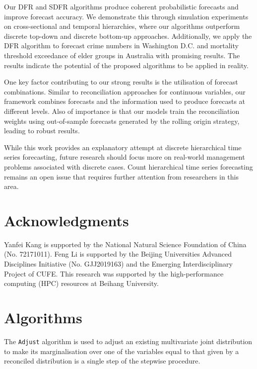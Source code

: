\documentclass[a4paper,review,12pt,authoryear]{elsarticle}
\let\code=\texttt
\theoremstyle{definition}
\begin{document}
     Our DFR and SDFR algorithms produce coherent probabilistic forecasts and improve forecast accuracy.
     We demonstrate this through simulation experiments on cross-sectional and temporal hierarchies, where our algorithms outperform discrete top-down and discrete bottom-up approaches. Additionally, we apply the DFR algorithm to forecast crime numbers in Washington D.C. and mortality threshold exceedance of elder groups in Australia with promising results.
     The results indicate the potential of the proposed algorithms to be applied in reality.

     One key factor contributing to our strong results is the utilisation of forecast combinations.
     Similar to reconciliation approaches for continuous variables, our framework combines forecasts and the information used to produce forecasts at different levels.
     Also of importance is that our models train the reconciliation weights using out-of-sample forecasts generated by the rolling origin strategy, leading to robust results.


     While this work provides an explanatory attempt at discrete hierarchical time series forecasting, future research should focus more on real-world management problems associated with discrete cases. Count hierarchical time series forecasting remains an open issue that requires further attention from researchers in this area.

\section*{Acknowledgments}

Yanfei Kang is supported by the National Natural Science Foundation of China (No. 72171011). Feng Li is supported by the Beijing Universities Advanced Disciplines Initiative (No. GJJ2019163) and the Emerging Interdisciplinary Project of CUFE. This research was supported by the high-performance computing (HPC) resources at Beihang University.


\begingroup
{}


\endgroup

\newpage

\appendix

\section{Algorithms}
\label{appendix:adjust}

The \code{Adjust} algorithm is used to adjust an existing multivariate joint distribution to make its marginalisation over one of the variables equal to that given by a reconciled distribution is a single step of the stepwise procedure.
\end{document}
